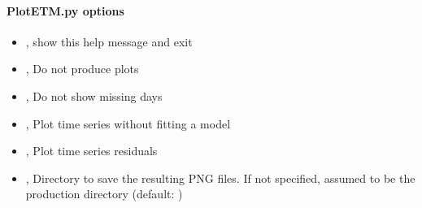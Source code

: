 \documentclass[letterpaper,10pt,english]{sphinxmanual}
\begin{document}
\paragraph{PlotETM.py options}
\label{\detokenize{com:PlotETM.py-options}}\begin{itemize}
\item {} 
\sphinxAtStartPar
{\hyperref[\detokenize{com:PlotETM.py--h}]{}}, {\hyperref[\detokenize{com:PlotETM.py---help}]{}} \sphinxhyphen{} show this help message and exit

\item {} 
\sphinxAtStartPar
{\hyperref[\detokenize{com:PlotETM.py--nop}]{}}, {\hyperref[\detokenize{com:PlotETM.py---no_plots}]{}} \sphinxhyphen{} Do not produce plots

\item {} 
\sphinxAtStartPar
{\hyperref[\detokenize{com:PlotETM.py--nom}]{}}, {\hyperref[\detokenize{com:PlotETM.py---no_missing_data}]{}} \sphinxhyphen{} Do not show missing days

\item {} 
\sphinxAtStartPar
{\hyperref[\detokenize{com:PlotETM.py--nm}]{}}, {\hyperref[\detokenize{com:PlotETM.py---no_model}]{}} \sphinxhyphen{} Plot time series without fitting a model

\item {} 
\sphinxAtStartPar
{\hyperref[\detokenize{com:PlotETM.py--r}]{}}, {\hyperref[\detokenize{com:PlotETM.py---residuals}]{}} \sphinxhyphen{} Plot time series residuals

\item {} 
\sphinxAtStartPar
{\hyperref[\detokenize{com:PlotETM.py--dir}]{}} , {\hyperref[\detokenize{com:PlotETM.py---directory}]{}}  \sphinxhyphen{} Directory to save the resulting PNG files. If not specified, assumed to be the production directory (default: )


\end{itemize}
\end{document}
